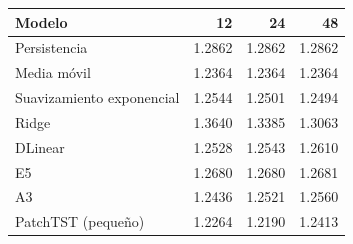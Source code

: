 \begin{tabular}{lrrr}
\toprule
Modelo & 12 & 24 & 48 \\
\midrule
Persistencia & 1.2862 & 1.2862 & 1.2862 \\
Media móvil & 1.2364 & 1.2364 & 1.2364 \\
Suavizamiento exponencial & 1.2544 & 1.2501 & 1.2494 \\
Ridge & 1.3640 & 1.3385 & 1.3063 \\
DLinear & 1.2528 & 1.2543 & 1.2610 \\
E5 & 1.2680 & 1.2680 & 1.2681 \\
A3 & 1.2436 & 1.2521 & 1.2560 \\
PatchTST (pequeño) & 1.2264 & 1.2190 & 1.2413 \\
\bottomrule
\end{tabular}
